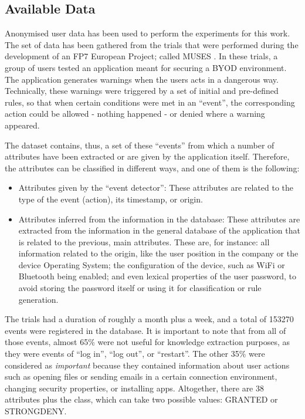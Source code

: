 \documentclass[runningheads,a4paper]{llncs}
\begin{document}
\subsection{Available Data}
\label{subsec:data}

Anonymised user data has been used to perform the experiments for this work. The set of data has been gathered from the trials that were performed during the development of an FP7 European Project; called MUSES \cite{DBLP:conf/sac/MoraCGZJEBAH14}. In these trials, a group of users tested an application meant for securing a BYOD environment. The application generates warnings when the users acts in a dangerous way. Technically, these warnings were triggered by a set of initial and pre-defined rules, so that when certain conditions were met in an ``event'', the corresponding action could be allowed - nothing happened - or denied where a warning appeared.

The dataset contains, thus, a set of these ``events'' from which a number of attributes have been extracted or are given by the application itself. Therefore, the attributes can be classified in different ways, and one of them is the following:
\begin{itemize}
  \item Attributes given by the ``event detector'': These attributes are related to the type of the event (action), its timestamp, or origin.
  \item Attributes inferred from the information in the database: These attributes are extracted from the information in the general database of the application that is related to the previous, main attributes.
       These are, for instance: all information related to the origin, like the user position in the company or the device Operating System; the configuration of the device, such as WiFi or Bluetooth being enabled; and even lexical properties of the user password, to avoid storing the password itself or using it for classification or rule generation.
\end{itemize}

The trials had a duration of roughly a month plus a week, and a total of 153270 events were registered in the database. It is important to note that from all of those events, almost 65\% were not useful for knowledge extraction purposes, as they were events of ``log in'', ``log out'', or ``restart''. The other 35\% were considered as \textit{important} because they contained information about user actions such as opening files or sending emails in a certain connection environment, changing security properties, or installing apps. Altogether, there are 38 attributes plus the class, which can take two possible values: GRANTED or STRONGDENY.
\end{document}
